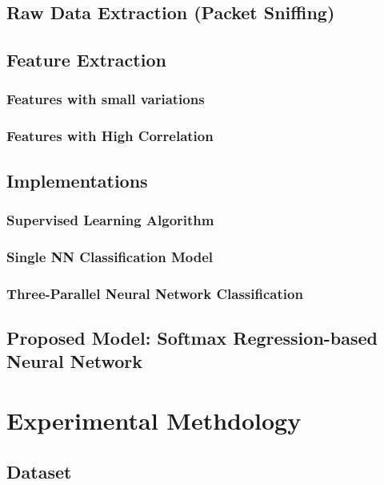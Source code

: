 \documentclass[12pt]{article}
\theoremstyle{definition}
\begin{document}
		\subsection{Raw Data Extraction (Packet Sniffing)}
		\lipsum[1-3]
		
		\subsection{Feature Extraction}
		\lipsum[1-6]
			\subsubsection{Features with small variations}
			\lipsum[1-3]
			\subsubsection{Features with High Correlation}
			\lipsum[1-3]
			
		\subsection{Implementations}
		\lipsum[1]
			\subsubsection{Supervised Learning Algorithm}
			\lipsum[1]
			\subsubsection{Single NN Classification Model}
			\lipsum[1]
			\subsubsection{Three-Parallel Neural Network Classification}
			\lipsum[1-2]
		\subsection{Proposed Model: Softmax Regression-based Neural Network}
		\lipsum[1-4]
	
	
	\cleardoublepage
	\section{Experimental Methdology}
	\lipsum[1]
		\subsection{Dataset}
		\lipsum[1-2]
\end{document}
